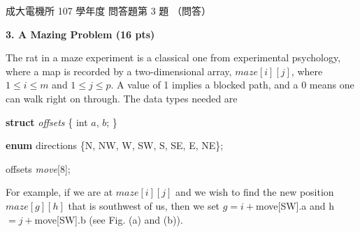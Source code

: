 \begin{pastexam}[label={px:ncku-107-ee-ds-07}]{成大電機所 107 學年度 問答題第 3 題}
（問答）

\textbf{3. A Mazing Problem (16 pts)}

The rat in a maze experiment is a classical one from experimental psychology, where a map is recorded
by a two-dimensional array, $maze[i][j]$, where $1\le i\le m$ and $1\le j\le p$. A value of 1 implies a
blocked path, and a 0 means one can walk right on through. The data types needed are

\quad \textbf{struct} \textit{offsets} \{ int $a$, $b$; \}

\quad \textbf{enum} directions \{N, NW, W, SW, S, SE, E, NE\};

\quad offsets \textit{move}[8];

For example, if we are at $maze[i][j]$ and we wish to find the new position $maze[g][h]$ that is
southwest of us, then we set $g=i+$move[SW].a and h $=j+$move[SW].b (see Fig. (a) and (b)).


\end{pastexam}
